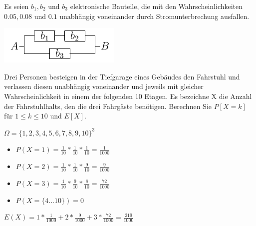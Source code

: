 \documentclass[10pt, a4paper]{exam}
\begin{document}
\begin{questions}
    \question Es seien $b_1,b_2$ und $b_3$ elektronische Bauteile, die mit den Wahrscheinlichkeiten $0.05, 0.08$ und $0.1$ unabhängig voneinander durch Stromunterbrechung ausfallen.
    \begin{center}
        \includegraphics[width=.2\linewidth]{Assets/GudS-schaltung.png}
    \end{center}

    \question Drei Personen besteigen in der Tiefgarage eines Gebäudes den Fahrstuhl und verlassen diesen unabhängig voneinander und jeweils mit gleicher Wahrscheinlichkeit in einem der folgenden 10 Etagen. Es bezeichne X die Anzahl der Fahrstuhlhalts, den die drei Fahrgäste benötigen. Berechnen Sie $P[X=k]$ für $1\leq k\leq 10$ und $E[X]$.
    \begin{solution}
        $\Omega=\{1,2,3,4,5,6,7,8,9,10\}^3$

        \begin{itemize}
            \item $P(X=1)=\frac{1}{10}*\frac{1}{10}*\frac{1}{10}=\frac{1}{1000}$
            \item $P(X=2)=\frac{1}{10}*\frac{1}{10}*\frac{9}{10}=\frac{9}{1000}$
            \item $P(X=3)=\frac{1}{10}*\frac{9}{10}*\frac{8}{10}=\frac{72}{1000}$
            \item $P(X=\{4...10\})=0$
        \end{itemize}
        $E(X)=1*\frac{1}{1000}+2*\frac{9}{1000}+3*\frac{72}{1000}=\frac{219}{1000}$
    \end{solution}


\end{questions}
\end{document}
